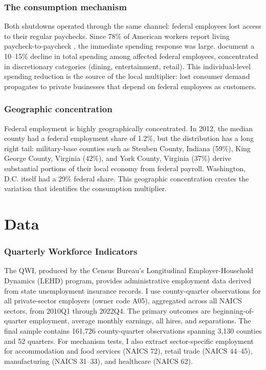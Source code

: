 \documentclass[12pt]{article}
\begin{document}
\subsubsection*{The consumption mechanism} Both shutdowns operated through the same channel: federal employees lost access to their regular paychecks. Since 78\% of American workers report living paycheck-to-paycheck \citep{paycheck2023}, the immediate spending response was large. \citet{gelman2023government} document a 10--15\% decline in total spending among affected federal employees, concentrated in discretionary categories (dining, entertainment, retail). This individual-level spending reduction is the source of the local multiplier: lost consumer demand propagates to private businesses that depend on federal employees as customers.

\subsubsection*{Geographic concentration} Federal employment is highly geographically concentrated. In 2012, the median county had a federal employment share of 1.2\%, but the distribution has a long right tail: military-base counties such as Steuben County, Indiana (59\%), King George County, Virginia (42\%), and York County, Virginia (37\%) derive substantial portions of their local economy from federal payroll. Washington, D.C. itself had a 29\% federal share. This geographic concentration creates the variation that identifies the consumption multiplier.

\section{Data}

\subsubsection*{Quarterly Workforce Indicators} The QWI, produced by the Census Bureau's Longitudinal Employer-Household Dynamics (LEHD) program, provides administrative employment data derived from state unemployment insurance records. I use county-quarter observations for all private-sector employers (owner code A05), aggregated across all NAICS sectors, from 2010Q1 through 2022Q4. The primary outcomes are beginning-of-quarter employment, average monthly earnings, all hires, and separations. The final sample contains 161,726 county-quarter observations spanning 3,130 counties and 52 quarters. For mechanism tests, I also extract sector-specific employment for accommodation and food services (NAICS 72), retail trade (NAICS 44--45), manufacturing (NAICS 31--33), and healthcare (NAICS 62).
\end{document}
